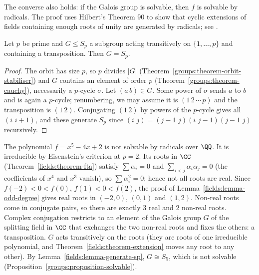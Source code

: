 \begin{remark}\label{fields:remark-converse-radicals}
The converse also holds: if the Galois group is solvable, then $f$ is solvable by radicals.
The proof uses Hilbert's Theorem 90 to show that cyclic extensions of fields containing
enough roots of unity are generated by radicals; see \cite[Chapter VI, \S 7]{lang-algebra}.
\end{remark}

\begin{lemma}\label{fields:lemma-generate-sp}
Let $p$ be prime and $G \leq S_p$ a subgroup acting transitively on $\{1, \ldots, p\}$ and containing a
transposition. Then $G = S_p$.
\end{lemma}

\begin{proof}
The orbit has size $p$, so $p$ divides $|G|$ (Theorem~\ref{groups:theorem-orbit-stabiliser}) and $G$
contains an element of order $p$ (Theorem~\ref{groups:theorem-cauchy}), necessarily a $p$-cycle
$\sigma$. Let $(a\,b) \in G$. Some power of $\sigma$ sends $a$ to $b$ and is again a $p$-cycle; renumbering,
we may assume it is $(1\,2\,\cdots\,p)$ and the transposition is $(1\,2)$. Conjugating $(1\,2)$ by powers
of the $p$-cycle gives all $(i\,\,i{+}1)$, and these generate $S_p$ since
$(i\,\,j) = (j{-}1\,\,j)(i\,\,j{-}1)(j{-}1\,\,j)$ recursively.
\end{proof}

\begin{example}\label{fields:example-quintic}
The polynomial $f = x^5 - 4x + 2$ is not solvable by radicals over $\QQ$. It is irreducible by
Eisenstein's criterion at $p = 2$. Its roots in $\CC$ (Theorem~\ref{fields:theorem-fta}) satisfy
$\sum \alpha_i = 0$ and $\sum_{i<j}\alpha_i\alpha_j = 0$ (the coefficients of $x^4$ and $x^3$ vanish), so
$\sum \alpha_i^2 = 0$; hence not all roots are real. Since $f(-2) < 0 < f(0)$, $f(1) < 0 < f(2)$, the proof
of Lemma~\ref{fields:lemma-odd-degree} gives real roots in $(-2, 0)$, $(0, 1)$ and $(1, 2)$. Non-real
roots come in conjugate pairs, so there are exactly $3$ real and $2$ non-real roots. Complex
conjugation restricts to an element of the Galois group $G$ of the splitting field in $\CC$ that
exchanges the two non-real roots and fixes the others: a transposition. $G$ acts transitively
on the roots (they are roots of one irreducible polynomial, and
Theorem~\ref{fields:theorem-extension} moves any root to any other). By
Lemma~\ref{fields:lemma-generate-sp}, $G \cong S_5$, which is not solvable
(Proposition~\ref{groups:proposition-solvable}).
\end{example}

